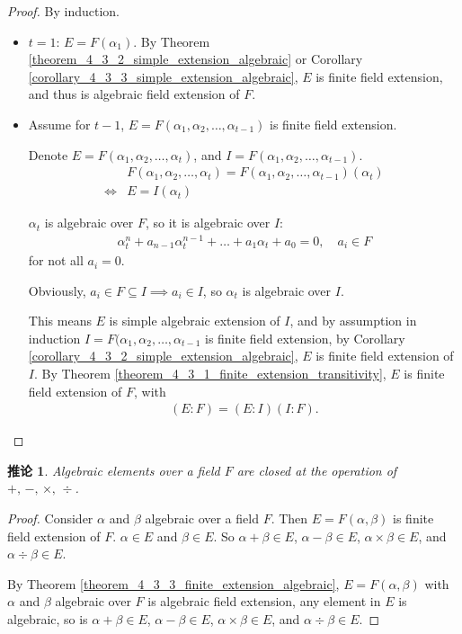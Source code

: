 \documentclass[utf8]{ctexbook}
\newtheorem{corollary}{推论}[section]
\begin{document}
\begin{proof}
By induction.

\begin{itemize}
\item{$t=1$: $E= F(\alpha_1)$. By Theorem \ref{theorem_4_3_2_simple_extension_algebraic} or Corollary \ref{corollary_4_3_3_simple_extension_algebraic}, $E$ is finite field extension, and thus is algebraic field extension of $F$.}
\item{Assume for $t-1$, $E=F(\alpha_1, \alpha_2, \ldots, \alpha_{t-1})$ is finite field extension. 

Denote $E=F(\alpha_1, \alpha_2, \ldots, \alpha_t)$, and  $I = F(\alpha_1, \alpha_2, \ldots, \alpha_{t-1}) $. 
\begin{align*}
& F(\alpha_1, \alpha_2, \ldots, \alpha_t) = F(\alpha_1, \alpha_2, \ldots, \alpha_{t-1}) (\alpha_t) \\
\iff & E = I(\alpha_t) 
\end{align*}

$\alpha_t$ is algebraic over $F$, so it is algebraic over $I$:
\begin{align*}
\alpha_t ^n + a_{n-1} \alpha_t ^{n-1} + \ldots + a_1 \alpha_t + a_0 = 0, \quad a_i \in F
\end{align*} 
for not all $a_i = 0$. 

Obviously, $a_i \in F \subseteq I \implies a_i \in I$, so $\alpha_t$ is algebraic over $I$.

This means $E$ is simple algebraic extension of $I$, and by assumption in induction $I =  F(\alpha_1, \alpha_2, \ldots , \alpha_{t-1}$ is finite field extension, by Corollary \ref{corollary_4_3_2_simple_extension_algebraic}, $E$ is finite field extension of $I$. By Theorem \ref{theorem_4_3_1_finite_extension_transitivity}, $E$ is finite field extension of $F$, with
\begin{align*}
(E:F) = (E:I)(I:F) .
\end{align*}
}
\end{itemize}
\end{proof}

\begin{corollary}
\label{corollary_4_3_4_algebraic_closed}
Algebraic elements over a field $F$ are closed at the operation of $+, \, -, \, \times , \, \div $.
\end{corollary}

\begin{proof}
Consider $\alpha$ and $\beta$ algebraic over a field $F$. Then $E = F(\alpha, \beta)$ is finite field extension of $F$. $\alpha \in E$ and $\beta \in E$. So $\alpha + \beta \in E $, $\alpha - \beta \in E $, $\alpha \times \beta \in E $, and $\alpha \div \beta \in E $.

By Theorem \ref{theorem_4_3_3_finite_extension_algebraic}, $E= F(\alpha, \beta)$ with $\alpha$ and $\beta$ algebraic over $F$ is algebraic field extension, any element in $E$ is algebraic, so is $\alpha + \beta \in E $, $\alpha - \beta \in E $, $\alpha \times \beta \in E $, and $\alpha \div \beta \in E $.
\end{proof}
\end{document}
